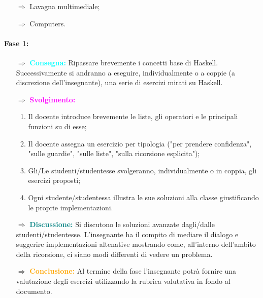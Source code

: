 \begin{itemize}
    \item [$\Rightarrow$] Lavagna multimediale;
    \item [$\Rightarrow$] Computers.
\end{itemize}


\paragraph{Fase 1:}

\begin{itemize}
    \item [$\Rightarrow$] \textbf{\textcolor{cyan}{Consegna:}} Ripassare brevemente i concetti base di Haskell. Successivamente
    si andranno a eseguire, individualmente o a coppie (a discrezione dell'insegnante), una serie di esercizi mirati su Haskell. 
    \item [$\Rightarrow$] \textbf{\textcolor{magenta}{Svolgimento:}}
    \begin{enumerate}
        \item Il docente introduce brevemente le liste, gli operatori e le principali funzioni su di esse;
        \item Il docente assegna un esercizio per tipologia ("per prendere confidenza", "sulle guardie", "sulle liste", "sulla ricorsione esplicita");
        \item Gli/Le studenti/studentesse svolgeranno, individualmente o in coppia, gli esercizi proposti;
        \item Ogni studente/studentessa illustra le sue soluzioni alla classe giustificando le proprie implementazioni.
    \end{enumerate}
    \item [$\Rightarrow$] \textbf{\textcolor{teal}{Discussione:}} Si discutono le soluzioni avanzate dagli/dalle studenti/studentesse.
    L'insegnante ha il compito di mediare il dialogo e suggerire implementazioni altenative mostrando come, all'interno dell'ambito della ricorsione,
    ci siano modi differenti di vedere un problema.
    \item [$\Rightarrow$] \textbf{\textcolor{orange}{Conclusione:}} Al termine della fase l'insegnante 
    potrà fornire una valutazione degli esercizi utilizzando la rubrica valutativa in fondo al documento. 
\end{itemize}

